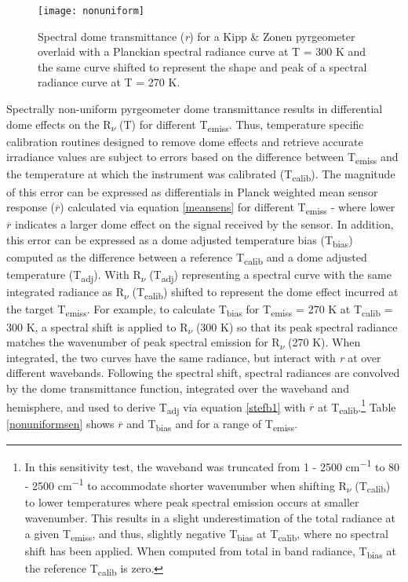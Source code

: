 \begin{bibunit}
\begin{figure}[H]
	\centering
	\texttt{[image: nonuniform]}
	\caption{Spectral dome transmittance (\textit{r}) for a Kipp \& Zonen pyrgeometer overlaid with a Planckian spectral radiance curve at T = 300 \si{\kelvin} and the same curve shifted to represent the shape and peak of a spectral radiance curve at T = 270 \si{\kelvin}.}
	\label{nonuniform}
\end{figure}

Spectrally non-uniform pyrgeometer dome transmittance results in differential dome effects on the R\textsubscript{$\nu$} (T) for different T\textsubscript{emiss}. Thus, temperature specific calibration routines designed to remove dome effects and retrieve accurate irradiance values are subject to errors based on the difference between T\textsubscript{emiss} and the temperature at which the instrument was calibrated (T\textsubscript{calib}). The magnitude of this error can be expressed as differentials in Planck weighted mean sensor response ($\overline{r} $) calculated via equation \ref{meansens} for different T\textsubscript{emiss} - where lower $\overline{r} $ indicates a larger dome effect on the signal received by the sensor. In addition, this error can be expressed as a dome adjusted temperature bias (T\textsubscript{bias}) computed as the difference between a reference T\textsubscript{calib} and a dome adjusted temperature (T\textsubscript{adj}). With R\textsubscript{$\nu$} (T\textsubscript{adj}) representing a spectral curve with the same integrated radiance as R\textsubscript{$\nu$} (T\textsubscript{calib}) shifted to represent the dome effect incurred at the target T\textsubscript{emiss}. For example, to calculate T\textsubscript{bias} for T\textsubscript{emiss} = 270 \si{\kelvin} at T\textsubscript{calib} = 300 \si{\kelvin}, a spectral shift is applied to R\textsubscript{$\nu$} (300 \si{\kelvin}) so that its peak spectral radiance matches the wavenumber of peak spectral emission for R\textsubscript{$\nu$} (270 \si{\kelvin}). When integrated, the two curves have the same radiance, but interact with \textit{r} at over different wavebands. Following the spectral shift, spectral radiances are convolved by the dome transmittance function, integrated over the waveband and hemisphere, and used to derive T\textsubscript{adj} via equation \ref{stefb1} with $\overline{r}$ at T\textsubscript{calib}.\footnote{In this sensitivity test, the waveband was truncated from 1 - 2500 \si{cm^{-1}} to 80 - 2500 \si{cm^{-1}} to accommodate shorter wavenumber when shifting R\textsubscript{$\nu$} (T\textsubscript{calib}) to lower temperatures where peak spectral emission occurs at smaller wavenumber. This results in a slight underestimation of the total radiance at a given T\textsubscript{emiss}, and thus, slightly negative T\textsubscript{bias} at T\textsubscript{calib}, where no spectral shift has been applied. When computed from total in band radiance, T\textsubscript{bias} at the reference T\textsubscript{calib} is zero.} Table \ref{nonuniformsen} shows $\overline{r}$ and T\textsubscript{bias} and for a range of T\textsubscript{emiss}.


\end{bibunit}
